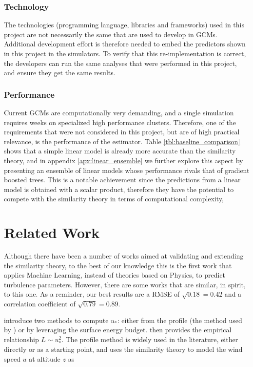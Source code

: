 \documentclass[a4paper,11pt]{kth-mag}
\begin{document}
\subsubsection{Technology} The technologies (programming language, libraries and frameworks) used in this project are not necessarily the same that are used to develop in GCMs. Additional development effort is therefore needed to embed the predictors shown in this project in the simulators. To verify that this re-implementation is correct, the developers can run the same analyses that were performed in this project, and ensure they get the same results.

\subsubsection{Performance} Current GCMs are computationally very demanding, and a single simulation requires weeks on specialized high performance clusters. Therefore, one of the requirements that were not considered in this project, but are of high practical relevance, is the performance of the estimator. Table \ref{tbl:baseline_comparison} shows that a simple linear model is already more accurate than the similarity theory, and in appendix \ref{apx:linear_ensemble} we further explore this aspect by presenting an ensemble of linear models whose performance rivals that of gradient boosted trees. This is a notable achievement since the predictions from a linear model is obtained with a scalar product, therefore they have the potential to compete with the similarity theory in terms of computational complexity,


\section{Related Work}
\label{sec:related_work}
Although there have been a number of works aimed at validating \citep{Businger1971,basicatm,Dyer1974,windprof_nosqr} and extending \citep{sheba_phim,most_teal,Wilson2008,aerodynamic_fluxes} the similarity theory, to the best of our knowledge this is the first work that applies Machine Learning, instead of theories based on Physics, to predict turbulence parameters. However, there are some works that are similar, in spirit, to this one. As a reminder, our best results are a RMSE of $\sqrt{0.18}=0.42$ and a correlation coefficient of $\sqrt{0.79}=0.89$.


\cite{VanUlden1985} introduce two methods to compute $u_*$: either from the profile (the method used by \cite{ustar_from_profile}) or by leveraging the surface energy budget. \cite{Venkatram1980} then provides the empirical relationship $L\sim u_*^2$. The profile method is widely used in the literature, either directly or as a starting point, and uses the similarity theory to model the wind speed $u$ at altitude $z$ as
\end{document}

